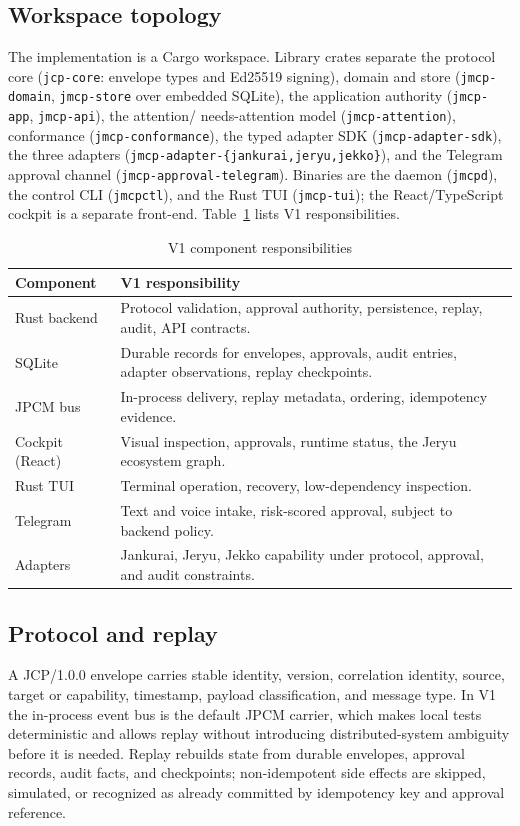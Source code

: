 \documentclass[conference]{IEEEtran}
\begin{document}
\subsection{Workspace topology}
The implementation is a Cargo workspace. Library crates separate the protocol
core (\texttt{jcp-core}: envelope types and Ed25519 signing), domain and store
(\texttt{jmcp-domain}, \texttt{jmcp-store} over embedded SQLite), the
application authority (\texttt{jmcp-app}, \texttt{jmcp-api}), the attention/
needs-attention model (\texttt{jmcp-attention}), conformance
(\texttt{jmcp-conformance}), the typed adapter SDK
(\texttt{jmcp-adapter-sdk}), the three adapters
(\texttt{jmcp-adapter-\{jankurai,jeryu,jekko\}}), and the Telegram approval
channel (\texttt{jmcp-approval-telegram}). Binaries are the daemon
(\texttt{jmcpd}), the control CLI (\texttt{jmcpctl}), and the Rust TUI
(\texttt{jmcp-tui}); the React/TypeScript cockpit is a separate front-end.
Table~\ref{tab:resp} lists V1 responsibilities.

\begin{table}[t]
\centering
\caption{V1 component responsibilities}
\label{tab:resp}
\begin{tabular}{@{}p{}p{}@{}}
\toprule
\textbf{Component} & \textbf{V1 responsibility} \\
\midrule
Rust backend & Protocol validation, approval authority, persistence, replay,
audit, API contracts. \\
SQLite & Durable records for envelopes, approvals, audit entries, adapter
observations, replay checkpoints. \\
JPCM bus & In-process delivery, replay metadata, ordering, idempotency
evidence. \\
Cockpit (React) & Visual inspection, approvals, runtime status, the Jeryu
ecosystem graph. \\
Rust TUI & Terminal operation, recovery, low-dependency inspection. \\
Telegram & Text and voice intake, risk-scored approval, subject to backend
policy. \\
Adapters & Jankurai, Jeryu, Jekko capability under protocol, approval, and
audit constraints. \\
\bottomrule
\end{tabular}
\end{table}

\subsection{Protocol and replay}
A JCP/1.0.0 envelope carries stable identity, version, correlation identity,
source, target or capability, timestamp, payload classification, and message
type. In V1 the in-process event bus is the default JPCM carrier, which makes
local tests deterministic and allows replay without introducing
distributed-system ambiguity before it is needed. Replay rebuilds state from
durable envelopes, approval records, audit facts, and checkpoints;
non-idempotent side effects are skipped, simulated, or recognized as already
committed by idempotency key and approval reference.
\end{document}
